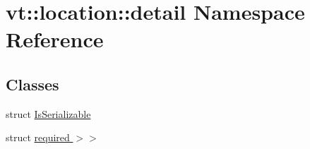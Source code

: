 \hypertarget{namespacevt_1_1location_1_1detail}{}\section{vt\+:\+:location\+:\+:detail Namespace Reference}
\label{namespacevt_1_1location_1_1detail}
\subsection*{Classes}
\begin{DoxyCompactItemize}
\item 
struct \hyperlink{structvt_1_1location_1_1detail_1_1_is_serializable}{Is\+Serializable}
\item 
struct \hyperlink{structvt_1_1location_1_1detail_1_1_is_serializable_3_01_msg_t_00_01typename_01std_1_1enable__if_fd1c49ec3e37e6e1c6b50c16f8e44731}{required $>$$>$}
\end{DoxyCompactItemize}
